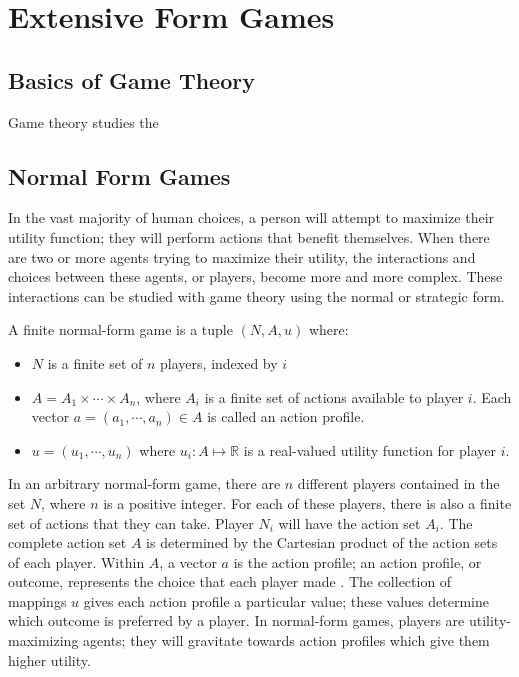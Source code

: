 \chapter{Extensive Form Games}
\section{Basics of Game Theory}
Game theory studies the 
\section{Normal Form Games}
In the vast majority of human choices, a person will attempt to maximize their utility function; they will perform actions that benefit themselves. When there are two or more agents trying to maximize their utility, the interactions and choices between these agents, or players, become more and more complex. These interactions can be studied with game theory using the normal or strategic form.
\begin{define}
  A finite normal-form game is a tuple $(N, A, u)$ where:
  \begin{itemize}
  \item $N$ is a finite set of $n$ players, indexed by $i$
  \item $A=A_1\times\cdots\times A_n$, where $A_i$ is a finite set of actions available to player $i$. Each vector $a=(a_1,\cdots ,a_n)\in A$ is called an action profile.
    \item $u=(u_1,\cdots ,u_n)$ where $u_i : A \mapsto\mathbb{R}$ is a real-valued utility function for player $i$.
\end{itemize}
\end{define}

In an arbitrary normal-form game, there are $n$ different players contained in the set $N$, where $n$ is a positive integer. For each of these players, there is also a finite set of actions that they can take. Player $N_i$ will have the action set $A_i$. The complete action set $A$ is determined by the Cartesian product of the action sets of each player. Within $A$, a vector $a$ is the action profile; an action profile, or outcome, represents the choice that each player made \cite{osbo94}. The collection of mappings $u$ gives each action profile a particular value; these values determine which outcome is preferred by a player. In normal-form games, players are utility-maximizing agents; they will gravitate towards action profiles which give them higher utility.\\

